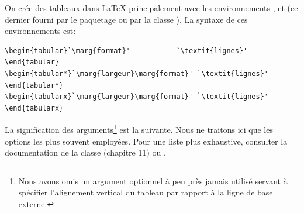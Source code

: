 On crée des tableaux dans {\LaTeX} principalement avec les
environnements ,  et  (ce
dernier fourni par le paquetage  ou par la classe
). La syntaxe de ces environnements est:
\begin{lstlisting}
\begin{tabular}`\marg{format}'           `\textit{lignes}' \end{tabular}
\begin{tabular*}`\marg{largeur}\marg{format}' `\textit{lignes}' \end{tabular*}
\begin{tabularx}`\marg{largeur}\marg{format}' `\textit{lignes}' \end{tabularx}
\end{lstlisting}
La signification des arguments\footnote{%
  Nous avons omis un argument optionnel à peu près jamais utilisé
  servant à spécifier l'alignement vertical du tableau par rapport à
  la ligne de base externe.} %
est la suivante. Nous ne traitons ici que les options les plus souvent
employées. Pour une liste plus exhaustive, consulter la documentation
de la classe  (chapitre 11) ou %
\citet[section ]{wikilivres:latex}.

